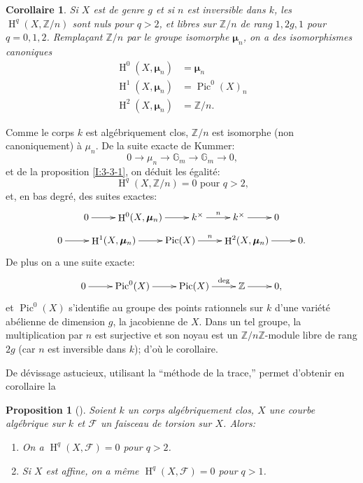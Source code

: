 \documentclass{book}
\DeclareMathOperator{\h}{H}
\DeclareMathOperator{\pic}{Pic}
\newcommand{\cF}{\mathcal{F}}
\newcommand{\dG}{\mathbb{G}}
\newcommand{\dmu}{{\bm\mu}}%
\newcommand{\dZ}{\mathbb{Z}}
\newtheorem{proposition}[subsubsection]{Proposition}
\newtheorem{corollary}[subsubsection]{Corollaire}
\begin{document}
\begin{corollary}\label{I:3-3-5}
Si $X$ est de genre $g$ et si $n$ est inversible dans $k$, les 
$\h^q(X,\dZ/n)$ sont nuls pour $q>2$, et libres sur $\dZ/n$ de rang $1,2 g,1$ 
pour $q=0,1,2$. Remplaçant $\dZ/n$ par le groupe isomorphe $\dmu_n$, on a des 
isomorphismes canoniques 
\begin{align*}
  \h^0(X,\dmu_n) &= \dmu_n \\
  \h^1(X,\dmu_n) &= \pic^0(X)_n \\
  \h^2(X,\dmu_n) &= \dZ/n \text{.}
\end{align*}
\end{corollary}

Comme le corps $k$ est algébriquement clos, $\dZ/n$ est isomorphe (non 
canoniquement) à $\mu_n$. De la suite exacte de Kummer:
\[
  0 \to \mu_n \to \dG_m \to \dG_m \to 0\text{,}
\]
et de la proposition \ref{I:3-3-1}, on déduit les égalité:
\[
  \h^q(X,\dZ/n) = 0 \text{ pour $q>2$,}
\]
et, en bas degré, des suites exactes:
\[\xymatrix{
  0 \ar[r] 
    & \h^0(X,\dmu_n) \ar[r] 
    & k^\times \ar[r]^-n 
    & k^\times \ar[r] 
    & 0
}\]
\[\xymatrix{
  0 \ar[r] 
    & \h^1(X,\dmu_n) \ar[r] 
    & \pic(X) \ar[r]^-n 
    & \h^2(X,\dmu_n) \ar[r] 
    & 0\text{.}
}\]
De plus on a une suite exacte:
\[\xymatrix{
  0 \ar[r] 
    & \pic^0(X) \ar[r] 
    & \pic(X) \ar[r]^-{\deg}
    & \dZ \ar[r] 
    & 0 \text{,}
}\]
et $\pic^0(X)$ s'identifie au groupe des points rationnels sur $k$ d'une 
variété abélienne de dimension $g$, la jacobienne de $X$. Dans un tel 
groupe, la multiplication par $n$ est surjective et son noyau est un 
$\dZ/n\dZ$-module libre de rang $2 g$ (car $n$ est inversible dans $k$); d'où 
le corollaire. 

De dévissage astucieux, utilisant la ``méthode de la trace,'' permet 
d'obtenir en corollaire la 





\begin{proposition}[{\cite[IX 5.7]{4}}]\label{I:3-3-6}
Soient $k$ un corps algébriquement clos, $X$ une courbe algébrique sur $k$ 
et $\cF$ un faisceau de torsion sur $X$. Alors:
\begin{enumerate}[\indent i)]
  \item On a $\h^q(X,\cF) = 0$ pour $q>2$.
  \item Si $X$ est affine, on a même $\h^q(X,\cF) = 0$ pour $q>1$.
\end{enumerate}
\end{proposition}
\end{document}

